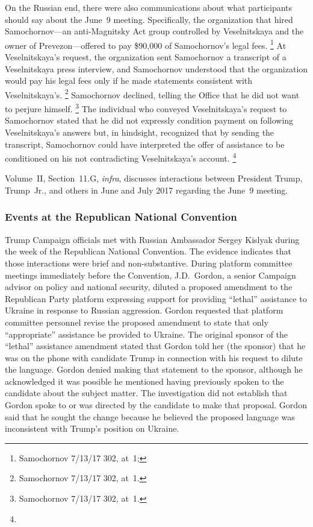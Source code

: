 On the Russian end, there were also communications about what participants should say about the June~9 meeting.
Specifically, the organization that hired Samochornov---an anti-Magnitsky Act group controlled by Veselnitskaya and the owner of Prevezon---offered to pay \$90,000 of Samochornov's legal fees.%
\footnote{Samochornov 7/13/17 302, at~1; }
At Veselnitskaya's request, the organization sent Samochornov a transcript of a Veselnitskaya press interview, and Samochornov understood that the organization would pay his legal fees only if he made statements consistent with Veselnitskaya's.%
\footnote{ Samochornov 7/13/17 302, at~1.}
Samochornov declined, telling the Office that he did not want to perjure himself.%
\footnote{Samochornov 7/13/17 302, at~1.}
The individual who conveyed Veselnitskaya's request to Samochornov stated that he did not expressly condition payment on following Veselnitskaya's answers but, in hindsight, recognized that by sending the transcript, Samochornov could have interpreted the offer of assistance to be conditioned on his not contradicting Veselnitskaya's account.%
\footnote{}

Volume~II, Section~11.G, \textit{infra}, discusses interactions between President Trump, Trump~Jr., and others in June and July 2017 regarding the June~9 meeting.

\subsubsection{Events at the Republican National Convention}

Trump Campaign officials met with Russian Ambassador Sergey Kislyak during the week of the Republican National Convention.
The evidence indicates that those interactions were brief and non-substantive.
During platform committee meetings immediately before the Convention, J.D.~Gordon, a senior Campaign advisor on policy and national security, diluted a proposed amendment to the Republican Party platform expressing support for providing ``lethal'' assistance to Ukraine in response to Russian aggression.
Gordon requested that platform committee personnel revise the proposed amendment to state that only ``appropriate'' assistance be provided to Ukraine.
The original sponsor of the ``lethal'' assistance amendment stated that Gordon told her (the sponsor) that he was on the phone with candidate Trump in connection with his request to dilute the language.
Gordon denied making that statement to the sponsor, although he acknowledged it was possible he mentioned having previously spoken to the candidate about the subject matter.
The investigation did not establish that Gordon spoke to or was directed by the candidate to make that proposal.
Gordon said that he sought the change because he believed the proposed language was inconsistent with Trump's position on Ukraine.

